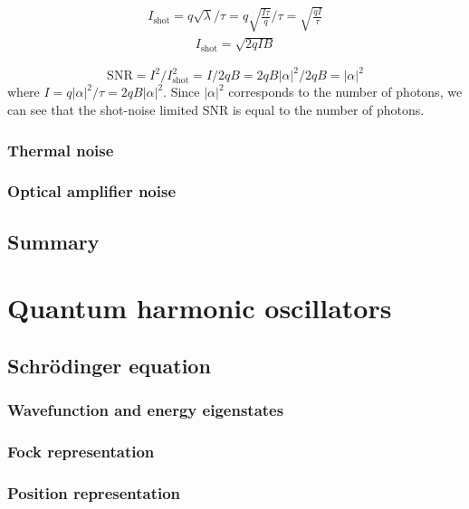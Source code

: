 \documentclass{book}
\begin{document}
\begin{equation}
	\begin{aligned}
		I_{\mathrm{shot}} = q\sqrt{\lambda}/\tau = q\sqrt{\frac{I\tau}{q}}/\tau = \sqrt{\frac{qI}{\tau}}
	\end{aligned}
\end{equation}
\begin{equation}
	\begin{aligned}
		I_\mathrm{shot}=\sqrt{2qIB}
	\end{aligned}
\end{equation}

\begin{equation}
  \mathrm{SNR} = I^2 / I_\mathrm{shot}^2 = I/2qB = 2qB|\alpha |^2/2qB = |\alpha|^2
\end{equation}
where $I=q|\alpha|^2/\tau = 2qB|\alpha|^2$. Since $|\alpha|^2$ corresponds to the number of photons, we can see that the shot-noise limited SNR is equal to the number of photons.


\subsection{Thermal noise}


\subsection{Optical amplifier noise}
\section{Summary}

\chapter{Quantum harmonic oscillators}
\section{Schr\"odinger equation}
\subsection{Wavefunction and energy eigenstates}
\subsection{Fock representation}
\subsection{Position representation}
\end{document}
